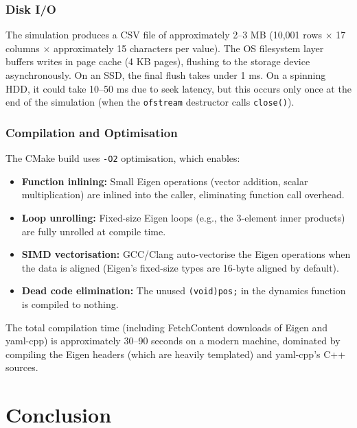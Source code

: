 \documentclass[12pt, a4paper]{article}
\begin{document}
\subsubsection{Disk I/O}

The simulation produces a CSV file of approximately 2--3 MB (10{,}001 rows $\times$ 17 columns $\times$ approximately 15 characters per value).  The OS filesystem layer buffers writes in page cache (4 KB pages), flushing to the storage device asynchronously.  On an SSD, the final flush takes under 1 ms.  On a spinning HDD, it could take 10--50 ms due to seek latency, but this occurs only once at the end of the simulation (when the \texttt{ofstream} destructor calls \texttt{close()}).

\subsubsection{Compilation and Optimisation}

The CMake build uses \texttt{-O2} optimisation, which enables:
\begin{itemize}
    \item \textbf{Function inlining:}  Small Eigen operations (vector addition, scalar multiplication) are inlined into the caller, eliminating function call overhead.
    \item \textbf{Loop unrolling:}  Fixed-size Eigen loops (e.g., the 3-element inner products) are fully unrolled at compile time.
    \item \textbf{SIMD vectorisation:}  GCC/Clang auto-vectorise the Eigen operations when the data is aligned (Eigen's fixed-size types are 16-byte aligned by default).
    \item \textbf{Dead code elimination:}  The unused \texttt{(void)pos;} in the dynamics function is compiled to nothing.
\end{itemize}

The total compilation time (including FetchContent downloads of Eigen and yaml-cpp) is approximately 30--90 seconds on a modern machine, dominated by compiling the Eigen headers (which are heavily templated) and yaml-cpp's C++ sources.

\section{Conclusion}
\end{document}
